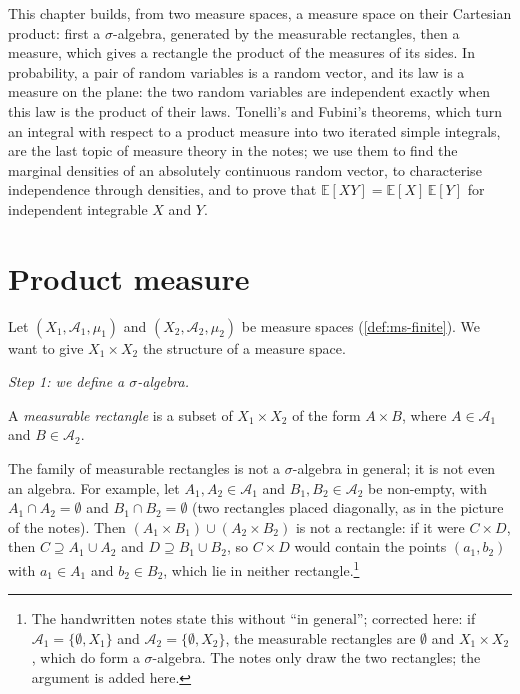 
This chapter builds, from two measure spaces, a measure space on their Cartesian product:
first a $\sigma$-algebra, generated by the measurable rectangles, then a measure, which gives
a rectangle the product of the measures of its sides. In probability, a pair of random
variables is a random vector, and its law is a measure on the plane: the two random variables
are independent exactly when this law is the product of their laws. Tonelli's and Fubini's
theorems, which turn an integral with respect to a product measure into two iterated simple
integrals, are the last topic of measure theory in the notes; we use them to find the
marginal densities of an absolutely continuous random vector, to characterise independence
through densities, and to prove that $\mathbb E[XY]=\mathbb E[X]\,\mathbb E[Y]$ for
independent integrable $X$ and $Y$.

\section{Product measure}\label{sec:pm-product}

Let $(X_1,\mathcal A_1,\mu_1)$ and $(X_2,\mathcal A_2,\mu_2)$ be measure spaces
(\cref{def:ms-finite}). We want to give $X_1\times X_2$ the structure of a measure space.

\emph{Step 1: we define a $\sigma$-algebra.}

\begin{definition}\label{def:pm-rectangle}
A \emph{measurable rectangle} is a subset of $X_1\times X_2$ of the form $A\times B$, where
$A\in\mathcal A_1$ and $B\in\mathcal A_2$.
\end{definition}

\begin{remark}\label{rem:pm-rectangles}
The family of measurable rectangles is not a $\sigma$-algebra in general; it is not even an
algebra. For example, let $A_1,A_2\in\mathcal A_1$ and $B_1,B_2\in\mathcal A_2$ be non-empty,
with $A_1\cap A_2=\emptyset$ and $B_1\cap B_2=\emptyset$ (two rectangles placed diagonally,
as in the picture of the notes). Then $(A_1\times B_1)\cup(A_2\times B_2)$ is not a rectangle: if it
were $C\times D$, then $C\supseteq A_1\cup A_2$ and $D\supseteq B_1\cup B_2$, so $C\times D$
would contain the points $(a_1,b_2)$ with $a_1\in A_1$ and $b_2\in B_2$, which lie in neither
rectangle.\footnote{The handwritten notes state this without ``in general''; corrected here:
if $\mathcal A_1=\{\emptyset,X_1\}$ and $\mathcal A_2=\{\emptyset,X_2\}$, the measurable
rectangles are $\emptyset$ and $X_1\times X_2$, which do form a $\sigma$-algebra. The notes
only draw the two rectangles; the argument is added here.}
\end{remark}

